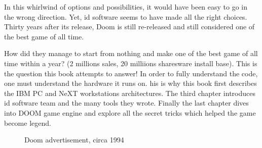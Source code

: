  \par
 In this whirlwind of options and possibilities, it would have been easy to go in the wrong direction. Yet, id software seems to have made all the right choices. Thirty years after its release, Doom is still re-released and still considered one of the best game of all time.\\
\par
 How did they manage to start from nothing and make one of the best game of all time within a year? (2 millions sales, 20 milliions sharesware install base). This is the question this book attempts to answer! In order to fully understand the code, one must understand the hardware it runs on. his is why this book first describes the IBM PC and NeXT workstations architectures. The third chapter introduces id software team and the many tools they wrote. Finally the last chapter dives into DOOM game engine and explore all the secret tricks which helped the game become legend.\\
\par

\begin{figure}[H]
\centering
{}
\caption{Doom advertisement, circa 1994}
\end{figure}
